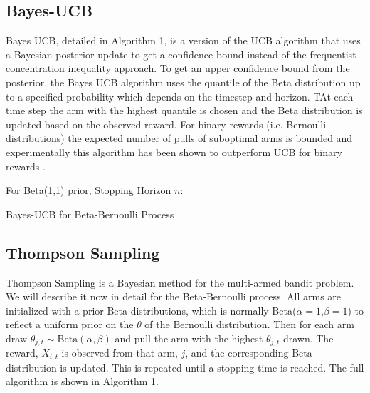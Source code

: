 \documentclass[journal,transmag]{IEEEtran}%
\begin{document}



\subsection{Bayes-UCB}
Bayes UCB, detailed in Algorithm 1, is a version of the UCB algorithm that uses a Bayesian posterior update to get a confidence bound instead of  the frequentist concentration inequality approach. To get an upper confidence bound from the posterior, the Bayes UCB algorithm uses the quantile of the Beta distribution up to a specified probability which depends on the timestep and horizon. TAt each time step the arm with the highest quantile is chosen and the Beta distribution is updated based on the observed reward.  For binary rewards (i.e. Bernoulli distributions) the expected number of pulls of suboptimal arms is bounded and experimentally this algorithm has been shown to outperform UCB for binary rewards \cite{kaufmann2012bayesian}.

\begin{algorithm}
 For Beta(1,1) prior, Stopping Horizon $n$: \\
 \caption{Bayes-UCB for Beta-Bernoulli Process}
\end{algorithm}


\subsection{Thompson Sampling}
Thompson Sampling is a Bayesian method for the multi-armed bandit problem. We will describe it now in detail for the Beta-Bernoulli process. All arms are initialized with a prior Beta distributions, which is normally Beta($\alpha=1$,$\beta =1$) to reflect a uniform prior on the $\theta$ of the Bernoulli distribution. Then for each arm draw $\theta_{j,t} \sim \mbox{Beta}(\alpha,\beta)$ and pull the arm with the highest $\theta_{j,t}$ drawn. The reward, $X_{i,t}$ is observed from that arm, $j$, and the corresponding Beta distribution is updated. This is repeated until a stopping time is reached. The full algorithm is shown in Algorithm 1.  
\end{document}
